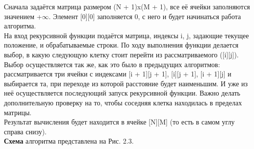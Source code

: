 \documentclass[12pt]{report}
\begin{document}
Сначала задаётся матрица размером (N + 1)x(M + 1), все её ячейки заполняются значением +{$\infty$}. Элемент [0][0] заполняется 0, с него и будет начинаться работа алгоритма.\\

На вход рекурсивной функции подаётся матрица, индексы i, j, задающие текущее положение, и обрабатываемые строки. По ходу выполнения функции делается выбор, в какую следующую клетку стоит перейти из рассматриваемого ([i][j]). Выбор осуществляется так же, как это было в предыдущих алгоритмов: рассматривается три ячейки с индексами [i + 1][j + 1], [i][j + 1], [i + 1][j] и выбирается та, при переходе из которой расстояние будет наименьшим. И уже из неё осуществляется последующий запуск рекурсивной функции. Важно делать дополнительную проверку на то, чтобы соседняя клетка находилась в пределах матрицы.\\

Результат вычисления будет находится в ячейке [N][M] (то есть в самом углу справа снизу).\\

\textbf{Схема} алгоритма представлена на Рис. 2.3.
\end{document}
